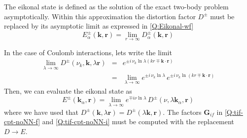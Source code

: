 The eikonal state is defined as the solution of the exact two-body problem
asymptotically. Within this approximation the distortion factor $D^{\pm}$ must
be replaced by its asymptotic limit as expressed in \ref{Q:Eikonal-wf}
\[
E^{\pm}_{\alpha}(\bm{k},\bm{r}) = \lim_{r \to \infty}
D^{\pm}_{\alpha}(\bm{k},\bm{r})
\]

In the case of Coulomb interactions, lets write the limit
\begin{eqnarray*}
\lim_{\lambda \to \infty} D^{\pm}(\nu_{k}, \bm{k},\lambda \bm{r}) &=& e^{{\pm}
i \, \nu_{k} \ln{\lambda \left( k r \mp \bm{k}\cdot \bm{r} \right)}}
\\
&=& \lim_{\lambda \to \infty} e^{\pm i \, \nu_{k} \ln{\lambda}} \, e^{
\pm i \, \nu_{k} \ln{\left( k r \mp \bm{k} \cdot \bm{r} \right)}}
\end{eqnarray*}
%
Then, we can evaluate the eikonal state as
%
\begin{equation}\label{Q:Eikonal-wf-Coul}
E^{\pm} (\bm{k}_{\alpha}, \bm{r}) = \lim_{\lambda \to \infty} e^{\mp i
\nu \ln{ \lambda}} \, D^{\pm}(\nu , \lambda \bm{k}_{\alpha}, \bm{r})
\end{equation}
where we have used that $D^{\pm} (\bm{k},\lambda \bm{r})= D^{\pm} (\lambda
\bm{k}, \bm{r})$.
%
The factors $\bm{G}_{if}$ in \ref{Q:tif-cpt-noNN-f} and
\ref{Q:tif-cpt-noNN-i} must be computed with the replacement $D \to E$.
